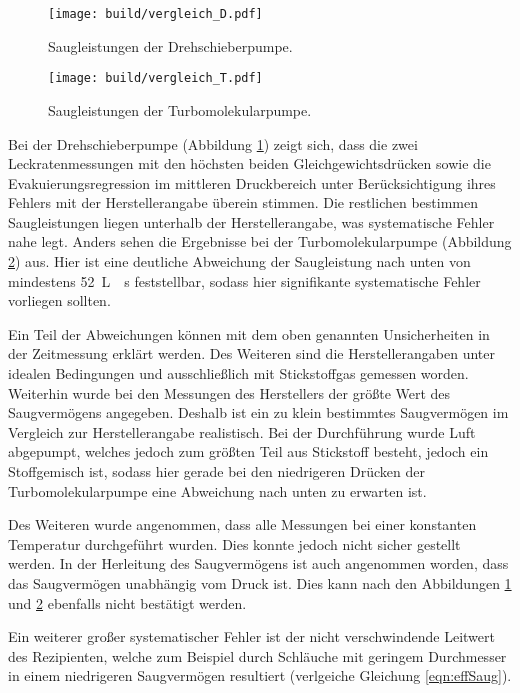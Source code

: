 \begin{figure}
  \centering
  \texttt{[image: build/vergleich\_D.pdf]}
  \caption{Saugleistungen der Drehschieberpumpe.}
  \label{fig:vgl_D}
\end{figure}
\begin{figure}
  \centering
  \texttt{[image: build/vergleich\_T.pdf]}
  \caption{Saugleistungen der Turbomolekularpumpe.}
  \label{fig:vgl_T}
\end{figure}
\FloatBarrier

Bei der Drehschieberpumpe (Abbildung \ref{fig:vgl_D}) zeigt sich,
dass die zwei Leckratenmessungen mit den
höchsten beiden Gleichgewichtsdrücken sowie die Evakuierungsregression im
mittleren Druckbereich unter Berücksichtigung ihres Fehlers mit der Herstellerangabe
überein stimmen. Die restlichen bestimmen Saugleistungen liegen unterhalb der
Herstellerangabe, was systematische Fehler nahe legt.
Anders sehen die Ergebnisse bei der Turbomolekularpumpe
(Abbildung \ref{fig:vgl_T}) aus. Hier ist eine deutliche Abweichung der
Saugleistung nach unten von mindestens \SI{52}{\liter{}\second}
feststellbar, sodass hier signifikante systematische Fehler vorliegen sollten.

Ein Teil der Abweichungen können mit dem oben genannten Unsicherheiten in
der Zeitmessung erklärt werden. Des Weiteren sind die Herstellerangaben
unter idealen Bedingungen und ausschließlich mit Stickstoffgas gemessen
worden. Weiterhin wurde bei den Messungen des Herstellers der größte
Wert des Saugvermögens angegeben. Deshalb ist ein zu klein bestimmtes
Saugvermögen im Vergleich zur Herstellerangabe realistisch. Bei der
Durchführung wurde Luft abgepumpt, welches jedoch zum größten Teil aus
Stickstoff besteht, jedoch ein Stoffgemisch ist, sodass hier gerade bei
den niedrigeren Drücken der Turbomolekularpumpe eine Abweichung nach unten
zu erwarten ist.

Des Weiteren wurde angenommen, dass alle Messungen bei einer konstanten
Temperatur durchgeführt wurden. Dies konnte jedoch nicht sicher gestellt werden.
In der Herleitung des Saugvermögens ist auch angenommen worden, dass das
Saugvermögen unabhängig vom Druck ist. Dies kann nach den Abbildungen
\ref{fig:vgl_D} und \ref{fig:vgl_T} ebenfalls nicht bestätigt werden.

Ein weiterer großer systematischer Fehler ist der nicht verschwindende Leitwert
des Rezipienten, welche zum Beispiel durch Schläuche mit geringem Durchmesser
in einem niedrigeren Saugvermögen resultiert (verlgeiche Gleichung \eqref{eqn:effSaug}).

